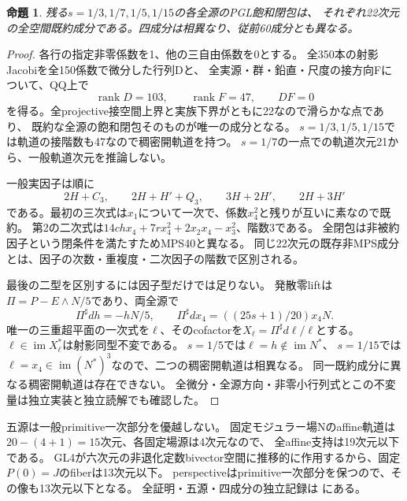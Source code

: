\documentclass[a4paper,11pt]{ltjsarticle}
\newtheorem{proposition}{命題}[section]
\theoremstyle{definition}
\begin{document}
\begin{proposition}\label{prop:nil-four-components}
残る$s=1/3,1/7,1/5,1/15$の各全源のPGL飽和閉包は、
それぞれ22次元の全空間既約成分である。四成分は相異なり、従前60成分とも異なる。
\end{proposition}
\begin{proof}
各行の指定非零係数を1、他の三自由係数を0とする。
全350本の射影Jacobiを全150係数で微分した行列Dと、
全実源・群・鉛直・尺度の接方向Fについて、QQ上で
\[
 \operatorname{rank}D=103,\qquad\operatorname{rank}F=47,\qquad DF=0
\]
を得る。全projective接空間上界と実族下界がともに22なので滑らかな点であり、
既約な全源の飽和閉包そのものが唯一の成分となる。
$s=1/3,1/5,1/15$では軌道の接階数も47なので稠密開軌道を持つ。
$s=1/7$の一点での軌道次元21から、一般軌道次元を推論しない。

一般実因子は順に
\[
 2H+C_3,\qquad2H+H'+Q_3,\qquad3H+2H',\qquad2H+3H'
\]
である。最初の三次式は$x_1$について一次で、係数$x_4^2$と残りが互いに素なので既約。
第2の二次式は$14chx_4+7rx_4^2+2x_2x_4-x_3^2$、階数3である。
全閉包は非被約因子という閉条件を満たすためMPS40と異なる。
同じ22次元の既存非MPS成分とは、因子の次数・重複度・二次因子の階数で区別される。

最後の二型を区別するには因子型だけでは足りない。
発散零liftは$\Pi=P-E\wedge N/5$であり、両全源で
\[
 \Pi^\sharp dh=-hN/5,\qquad
 \Pi^\sharp dx_4=((25s+1)/20)x_4N.
\]
唯一の三重超平面の一次式を$\ell$、そのcofactorを$X_\ell=\Pi^\sharp d\ell/\ell$とする。
$\ell\in\operatorname{im}X_\ell^*$は射影同型不変である。
$s=1/5$では$\ell=h\notin\operatorname{im}N^*$、
$s=1/15$では$\ell=x_4\in\operatorname{im}(N^*)^3$なので、二つの稠密開軌道は相異なる。
同一既約成分に異なる稠密開軌道は存在できない。
全微分・全源方向・非零小行列式とこの不変量は独立実装と独立読解でも確認した。
\end{proof}

五源は一般primitive一次部分を優越しない。
固定モジュラー場Nのaffine軌道は$20-(4+1)=15$次元、各固定場源は4次元なので、
全affine支持は19次元以下である。
GL4が六次元の非退化定数bivector空間に推移的に作用するから、固定$P(0)=J$のfiberは13次元以下。
perspectiveはprimitive一次部分を保つので、その像も13次元以下となる。
全証明・五源・四成分の独立記録は
にある。
\end{document}
